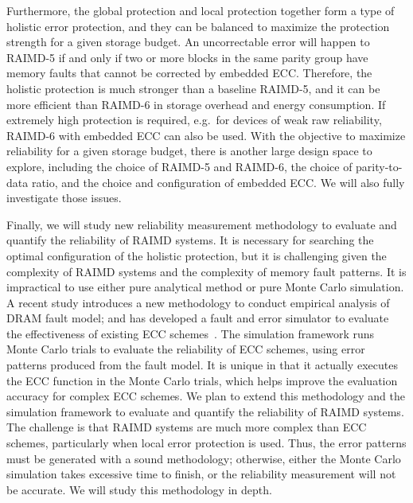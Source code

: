 \documentclass[11pt]{article}
\begin{document}
Furthermore, the global protection and local protection together form a type of
holistic error protection, and they can be balanced to maximize the protection
strength for a given storage budget.  An uncorrectable error will happen to
RAIMD-5 if and only if two or more blocks in the same parity group have memory
faults that cannot be corrected by embedded ECC.  Therefore, the holistic
protection is much stronger than a baseline RAIMD-5, and it can be more
efficient than RAIMD-6 in storage overhead and energy consumption.  If extremely
high protection is required, e.g.~for devices of weak raw reliability, RAIMD-6
with embedded ECC can also be used.  With the objective to maximize reliability
for a given storage budget, there is another large design space to explore,
including the choice of RAIMD-5 and RAIMD-6, the choice of parity-to-data ratio, and the
choice and configuration of embedded ECC.  We will also fully investigate those
issues.

Finally, we will study new reliability measurement methodology to evaluate and
quantify the reliability of RAIMD systems.  It is necessary for searching the
optimal configuration of the holistic protection, but it is challenging given
the complexity of RAIMD systems and the complexity of memory fault patterns.  It
is impractical to use either pure analytical method or pure Monte Carlo
simulation.  A recent study introduces a new methodology to conduct empirical
analysis of DRAM fault model; and has developed a fault and error simulator to
evaluate the effectiveness of existing ECC schemes~\cite{jun:micro23}.  The
simulation framework runs Monte Carlo trials to evaluate the reliability of ECC
schemes, using error patterns produced from the fault model.  It is unique in
that it actually executes the ECC function in the Monte Carlo trials, which
helps improve the evaluation accuracy for complex ECC schemes.  We plan to
extend this methodology and the simulation framework to evaluate and quantify
the reliability of RAIMD systems.  The challenge is that RAIMD systems are much
more complex than ECC schemes, particularly when local error protection is used.
Thus, the error patterns must be generated with a sound methodology; otherwise,
either the Monte Carlo simulation takes excessive time to finish, or the
reliability measurement will not be accurate.  We will study this methodology in
depth.

\end{document}

